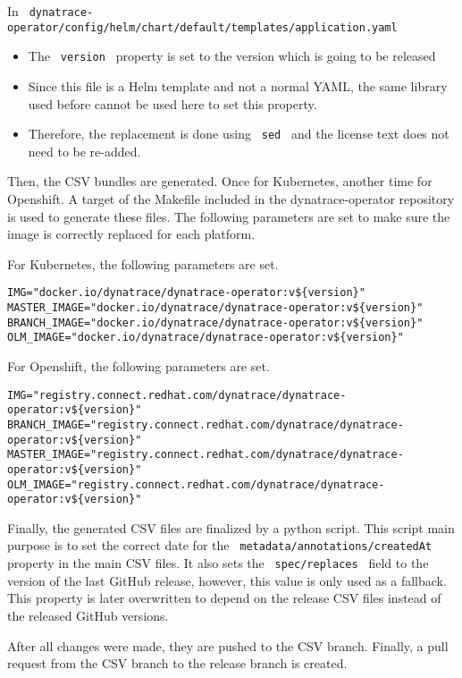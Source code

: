 In \verb| dynatrace-operator/config/helm/chart/default/templates/application.yaml |
\begin{itemize}
    \item The \verb| version | property is set to the version which is going to be released
    \item Since this file is a Helm template and not a normal YAML, the same library used before cannot be used here to set this property.
    \item Therefore, the replacement is done using \verb| sed | and the license text does not need to be re-added.
\end{itemize}

Then, the CSV bundles are generated.
Once for Kubernetes, another time for Openshift.
A target of the Makefile included in the dynatrace-operator repository is used to generate these files.
The following parameters are set to make sure the image is correctly replaced for each platform.

For Kubernetes, the following parameters are set.

\begin{verbatim}
IMG="docker.io/dynatrace/dynatrace-operator:v${version}"
MASTER_IMAGE="docker.io/dynatrace/dynatrace-operator:v${version}"
BRANCH_IMAGE="docker.io/dynatrace/dynatrace-operator:v${version}"
OLM_IMAGE="docker.io/dynatrace/dynatrace-operator:v${version}"
\end{verbatim}

For Openshift, the following parameters are set.

\begin{verbatim}
IMG="registry.connect.redhat.com/dynatrace/dynatrace-operator:v${version}"
BRANCH_IMAGE="registry.connect.redhat.com/dynatrace/dynatrace-operator:v${version}"
MASTER_IMAGE="registry.connect.redhat.com/dynatrace/dynatrace-operator:v${version}"
OLM_IMAGE="registry.connect.redhat.com/dynatrace/dynatrace-operator:v${version}"
\end{verbatim}

Finally, the generated CSV files are finalized by a python script.
This script main purpose is to set the correct date for the \verb| metadata/annotations/createdAt | property in the main CSV files.
It also sets the \verb| spec/replaces | field to the version of the last GitHub release, however, this value is only used as a fallback.
This property is later overwritten to depend on the release CSV files instead of the released GitHub versions.

After all changes were made, they are pushed to the CSV branch.
Finally, a pull request from the CSV branch to the release branch is created.

